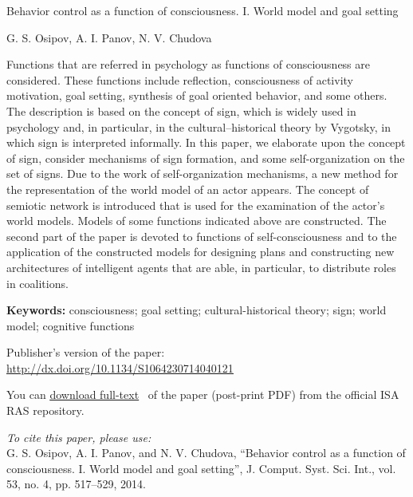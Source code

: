 \documentclass[oneside,final,14pt]{extarticle}
\begin{document}
	\color{TITLE}\LARGE
	\begin{center}
	Behavior control as a function of consciousness. I. World model and goal setting
	\end{center}
	\color{black}
	
	\vspace{5mm}
	\normalsize
	
	\begin{center}
		G. S. Osipov, A. I. Panov, N. V. Chudova
	\end{center}
	
	\vspace{8mm}
	
	Functions that are referred in psychology as functions of consciousness are considered. These functions include reflection, consciousness of activity motivation, goal setting, synthesis of goal oriented behavior, and some others. The description is based on the concept of sign, which is widely used in psychology and, in particular, in the cultural–historical theory by Vygotsky, in which sign is interpreted informally. In this paper, we elaborate upon the concept of sign, consider mechanisms of sign formation, and some self-organization on the set of signs. Due to the work of self-organization mechanisms, a new method for the representation of the world model of an actor appears. The concept of semiotic network is introduced that is used for the examination of the actor’s world models. Models of some functions indicated above are constructed. The second part of the paper is devoted to functions of self-consciousness and to the application of the constructed models for designing plans and constructing new architectures of intelligent agents that are able, in particular, to distribute roles in coalitions.
	
	\vspace{8mm}
	\textbf{Keywords: }consciousness; goal setting; cultural-historical theory; sign; world model; cognitive functions
		
	\vspace{8mm}
	
	Publisher's version of the paper:\\
	\color{blue}	
	\underline{\url{http://dx.doi.org/10.1134/S1064230714040121}}
	\color{black}
	\vspace{8mm}
	
	You can \color{blue}\underline{\href{http://www.isa.ru/arxiv/2014/Osipov,\%20Panov,\%20Chudova\%20-\%202014.pdf}{download full-text}}\color{black} \ of the paper (post-print PDF) from the official ISA RAS repository.
	
	\vspace{8mm}	
	
	\emph{To cite this paper, please use:}\\
	G. S. Osipov, A. I. Panov, and N. V. Chudova, “Behavior control as a function of consciousness. I. World model and goal setting”, J. Comput. Syst. Sci. Int., vol. 53, no. 4, pp. 517–529, 2014.
	
\end{document}
